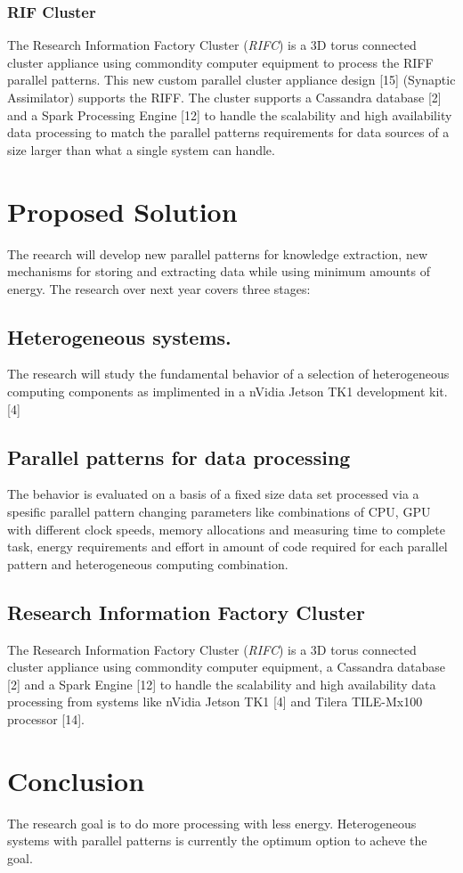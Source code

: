 \documentclass{acm_proc_article-sp}
\begin{document}
\subsubsection{RIF Cluster}
The Research Information Factory Cluster (\textit{RIFC}) is a 3D torus connected cluster appliance using commondity computer equipment to process the RIFF parallel patterns. This new custom parallel cluster appliance design [15] (Synaptic Assimilator) supports the RIFF. The cluster supports a Cassandra database [2] and a Spark Processing Engine [12] to handle the scalability and high availability data processing to match the parallel patterns requirements for data sources of a size larger than what a single system can handle.
\section{Proposed Solution}
The reearch will develop new parallel patterns for knowledge extraction, new mechanisms for storing and extracting data while using minimum amounts of energy.
The research over next year covers three stages:
\subsection{Heterogeneous systems.}
The research will study the fundamental behavior of a selection of heterogeneous computing components as implimented in a nVidia Jetson TK1 development kit. [4]
\subsection{Parallel patterns for data processing}
The behavior is evaluated on a basis of a fixed size data set processed via a spesific parallel pattern changing parameters like combinations of CPU, GPU with different clock speeds, memory allocations and measuring time to complete task, energy requirements and effort in amount of code required for each parallel pattern and heterogeneous computing combination. 
\subsection{Research Information Factory Cluster}
The Research Information Factory Cluster (\textit{RIFC}) is a 3D torus connected cluster appliance using commondity computer equipment, a Cassandra database [2] and a Spark Engine [12] to handle the scalability and high availability data processing from systems like nVidia Jetson TK1 [4] and Tilera TILE-Mx100 processor [14].
\section{Conclusion}
The research goal is to do more processing with less energy. Heterogeneous systems with parallel patterns is currently the optimum option to acheve the goal. 
\end{document}
